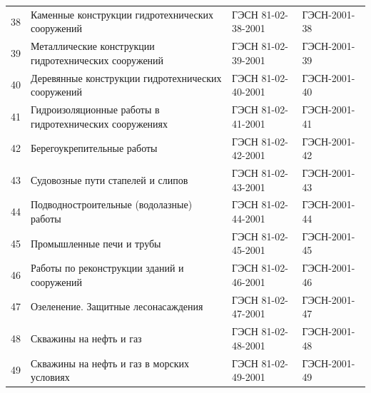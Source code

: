 \begin{longtable}[!hbp]{l p{5cm} p{5cm} p{3cm}}
    38 	& Каменные конструкции гидротехнических 
    сооружений								& ГЭСН 81-02-38-2001 	& ГЭСН-2001-38\\ 
    39 	& Металлические конструкции 
    гидротехнических сооружений				& ГЭСН 81-02-39-2001 	& ГЭСН-2001-39\\ 
    40 	& Деревянные конструкции гидротехнических 
    сооружений								& ГЭСН 81-02-40-2001 	& ГЭСН-2001-40\\ 
    41 	& Гидроизоляционные работы в 
    гидротехнических сооружениях			& ГЭСН 81-02-41-2001 	& ГЭСН-2001-41\\ 
    42 	& Берегоукрепительные работы				& ГЭСН 81-02-42-2001 	& ГЭСН-2001-42\\ 
    43 	& Судовозные пути стапелей и слипов			& ГЭСН 81-02-43-2001 	& ГЭСН-2001-43\\ 
    44 	& Подводностроительные (водолазные) работы	& ГЭСН 81-02-44-2001 	& ГЭСН-2001-44\\ 
    45 	& Промышленные печи и трубы					& ГЭСН 81-02-45-2001 	& ГЭСН-2001-45\\ 
    46 	& Работы по реконструкции зданий 
    и сооружений							& ГЭСН 81-02-46-2001 	& ГЭСН-2001-46\\ 
    47 	& Озеленение. Защитные лесонасаждения		& ГЭСН 81-02-47-2001 	& ГЭСН-2001-47\\ 
    48 	& Скважины на нефть и газ					& ГЭСН 81-02-48-2001 	& ГЭСН-2001-48\\ 
    49 	& Скважины на нефть и газ 
    в морских условиях						& ГЭСН 81-02-49-2001 	& ГЭСН-2001-49\\ 
\end{longtable}	
